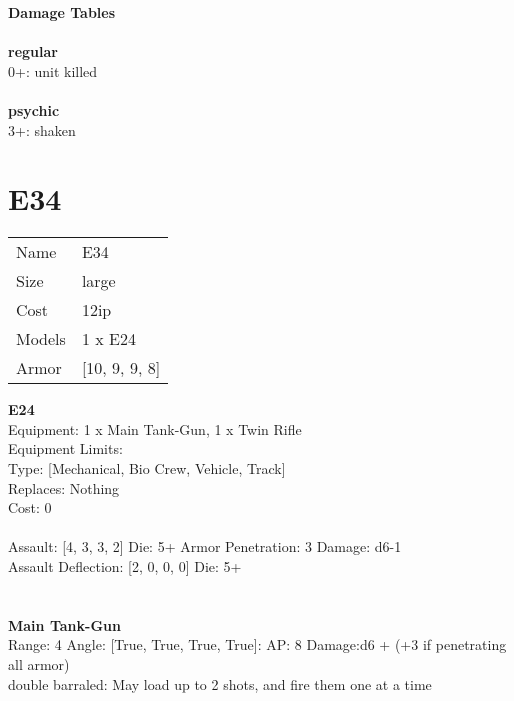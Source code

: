 {\bf Damage Tables} \\
\ \\ {\bf regular } \\
0+: unit killed \\
\ \\ {\bf psychic } \\
3+: shaken \\










\pagebreak\pagebreak

\section{ E34 }

\begin{tabular}{ll}
  Name & E34 \\
  Size & large\\
  Cost & 12ip\\
  Models & 1 x E24\\
  Armor & [10, 9, 9, 8]\\
\end{tabular}

\noindent 

{\bf E24 } \\
Equipment: 1 x Main Tank-Gun, 1 x Twin Rifle \\
Equipment Limits:  \\
Type: [Mechanical, Bio Crew, Vehicle, Track] \\
Replaces: Nothing \\
Cost: 0\\
\ \\
Assault: [4, 3, 3, 2] Die: 5+ Armor Penetration: 3 Damage: d6-1 \\
Assault Deflection: [2, 0, 0, 0] Die: 5+\\
\indent  
\ \\

\ \\
{\bf Main Tank-Gun } \\



Range: 4  Angle: [True, True, True, True]: AP: 8 Damage:d6 + (+3 if penetrating all armor) \\
double barraled: May load up to 2 shots, and fire them one at a time\\ 




